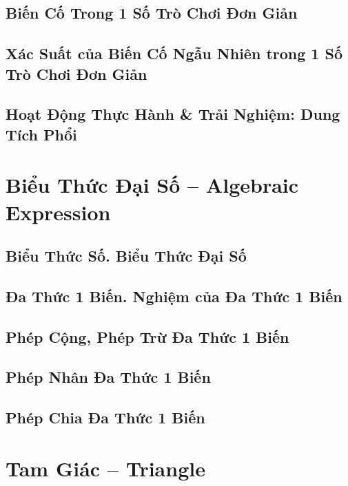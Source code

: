 \documentclass[oneside]{book}
\numberwithin{equation}{section}
\begin{document}
\section{Biến Cố Trong 1 Số Trò Chơi Đơn Giản}

\section{Xác Suất của Biến Cố Ngẫu Nhiên trong 1 Số Trò Chơi Đơn Giản}

\section{Hoạt Động Thực Hành \& Trải Nghiệm: Dung Tích Phổi}


\chapter{Biểu Thức Đại Số -- Algebraic Expression}

\section{Biểu Thức Số. Biểu Thức Đại Số}

\section{Đa Thức 1 Biến. Nghiệm của Đa Thức 1 Biến}

\section{Phép Cộng, Phép Trừ Đa Thức 1 Biến}

\section{Phép Nhân Đa Thức 1 Biến}

\section{Phép Chia Đa Thức 1 Biến}


\chapter{Tam Giác -- Triangle}
\end{document}
